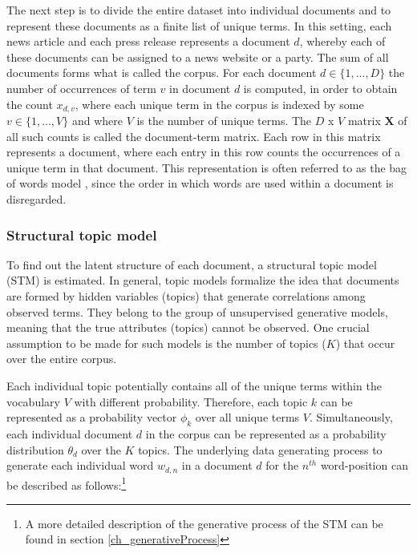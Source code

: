\documentclass[12pt,a4paper,notitlepage]{article}
\begin{document}
The next step is to divide the entire dataset into individual documents and to represent these documents as a finite list of unique terms. In this setting, each news article and each press release represents a document $d$, whereby each of these documents can be assigned to a news website or a party. The sum of all documents forms what is called the corpus. For each document $d \in \lbrace 1,...,D \rbrace$ the number of occurrences of term $v$ in document $d$ is computed, in order to obtain the count $x_{d,v}$, where each unique term in the corpus is indexed by some $v \in \lbrace 1,...,V \rbrace$ and where $V$ is the number of unique terms. The $D$ x $V$ matrix $\boldsymbol{X}$ of all such counts is called the document-term matrix. Each row in this matrix represents a document, where each entry in this row counts the occurrences of a unique term in that document. This representation is often referred to as the bag of words model \citep{gentzkow_text_2017}, since the order in which words are used within a document is disregarded.

\subsubsection{Structural topic model}

To find out the latent structure of each document, a structural topic model (STM) is estimated. In general, topic models formalize the idea that documents are formed by hidden variables (topics) that generate correlations among observed terms. They belong to the group of unsupervised generative models, meaning that the true attributes (topics) cannot be observed. One crucial assumption to be made for such models is the number of topics ($K$) that occur over the entire corpus. 

Each individual topic potentially contains all of the unique terms within the vocabulary $V$ with different probability. Therefore, each topic $k$ can be represented as a probability vector $\phi_k$ over all unique terms $V$. Simultaneously, each individual document $d$ in the corpus can be represented as a probability distribution $\theta_d$ over the $K$ topics. The underlying data generating process to generate each individual word $w_{d,n}$ in a document $d$ for the $n^{th}$ word-position can be described as follows:\footnote{A more detailed description of the generative process of the STM can be found in section \ref{ch_generativeProcess}}
\end{document}
